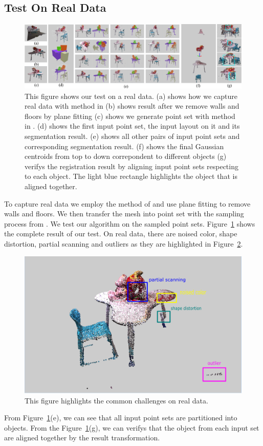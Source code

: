 \subsection{Test On Real Data}
\begin{figure}[htb]
	\centering
	\includegraphics[width=\linewidth]{images/realdata/realdata}
	\caption{\label{fig:realdata}This figure shows our test on a real data. (a) shows how we capture real data with method in \cite{VXH} (b) shows result after we remove walls and floors by plane fitting (c) shows we generate point set with method in \cite{PossionSampling}. (d) shows the first input point set, the input layout on it and its segmentation result. (e) shows all other pairs of input point sets and corresponding segmentation result. (f) shows the final Gaussian centroids from top to down correpondent to different objects (g) verifys the registration result by aligning input point sets respecting to each object. The light blue rectangle highlights the object that is aligned together. }
\end{figure}
To capture real data we employ the method of \cite{VXH} and use plane fitting to remove walls and floors. We then transfer the mesh into point set with the sampling process from \cite{PossionSampling}.
We test our algorithm on the sampled point sets. Figure~{\ref{fig:realdata}} shows the complete result of our test. On real data, there are noised color, shape distortion, partial scanning and outliers as they are highlighted in Figure~\ref{fig:challenge}. 
\begin{figure}
	\centering
	\includegraphics[width=\linewidth]{images/challenge/challenge}
	\caption{\label{fig:challenge}This figure highlights the common challenges on real data.}
\end{figure}
From Figure~\ref{fig:realdata}(e), we can see that all input point sets are partitioned into objects. From the Figure~\ref{fig:realdata}(g), we can verifys  that the object from each input set are aligned together by the result transformation.  
